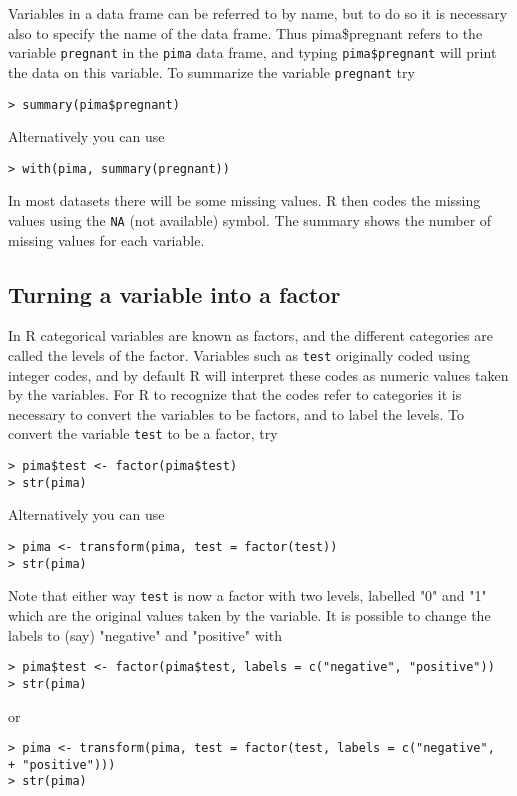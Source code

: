 \documentclass[12pt]{article}
\begin{document}
Variables in a data frame can be referred to by name, but to do so it is necessary also to specify
the name of the data frame. Thus pima\$pregnant refers to the variable \texttt{pregnant} in the \texttt{pima} data frame,
and typing \texttt{pima\$pregnant} will print the data on this variable. To summarize the variable \texttt{pregnant} try
\begin{verbatim}
> summary(pima$pregnant)
\end{verbatim}

Alternatively you can use
\begin{verbatim}
> with(pima, summary(pregnant))
\end{verbatim}
In most datasets there will be some missing values. R then codes the missing values using the \texttt{NA} (not available) symbol. The summary shows the number of missing values for each variable.

\subsection{Turning a variable into a factor}

In R categorical variables are known as factors, and the different categories are called the levels of the factor. Variables such as \texttt{test} originally coded using integer codes, and by default R will interpret these codes as numeric values taken by the variables. For R to recognize that the codes refer to categories it is necessary to convert the variables to be factors, and to label the levels. To convert the variable \texttt{test} to be a factor, try
\begin{verbatim}
> pima$test <- factor(pima$test)
> str(pima)
\end{verbatim}
Alternatively you can use
\begin{verbatim}
> pima <- transform(pima, test = factor(test))
> str(pima)
\end{verbatim}
Note that either way \texttt{test} is now a factor with two levels, labelled "0" and "1" which are the original values taken by the variable. It is possible to change the labels to (say) "negative" and
"positive" with
\begin{verbatim}
> pima$test <- factor(pima$test, labels = c("negative", "positive"))
> str(pima)
\end{verbatim}
or
\begin{verbatim}
> pima <- transform(pima, test = factor(test, labels = c("negative",
+ "positive")))
> str(pima)
\end{verbatim}
\end{document}

